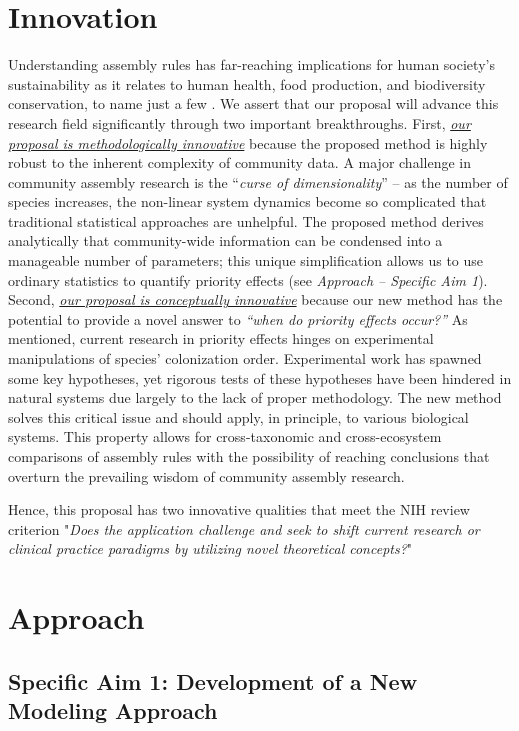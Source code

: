 \documentclass[12pt, class=article, crop=false]{standalone}
\begin{document}
\section{Innovation}
Understanding assembly rules has far-reaching implications for human society's sustainability as it relates to human health, food production, and biodiversity conservation, to name just a few \citep{fukami_historical_2015}.
We assert that our proposal will advance this research field significantly through two important breakthroughs.
First, \ul{\emph{our proposal is methodologically innovative}} because the proposed method is highly robust to the inherent complexity of community data.
A major challenge in community assembly research is the ``\textit{curse of dimensionality}'' -- as the number of species increases, the non-linear system dynamics become so complicated that traditional statistical approaches are unhelpful.
The proposed method derives analytically that community-wide information can be condensed into a manageable number of parameters; this unique simplification allows us to use ordinary statistics to quantify priority effects (see \textit{Approach -- Specific Aim 1}).
Second, \ul{\emph{our proposal is conceptually innovative}} because our new method has the potential to provide a novel answer to \textit{``when do priority effects occur?''}
As mentioned, current research in priority effects hinges on experimental manipulations of species' colonization order.
Experimental work has spawned some key hypotheses, yet rigorous tests of these hypotheses have been hindered in natural systems due largely to the lack of proper methodology. 
The new method solves this critical issue and should apply, in principle, to various biological systems.
This property allows for cross-taxonomic and cross-ecosystem comparisons of assembly rules with
the possibility of reaching conclusions that overturn the prevailing wisdom of community assembly research.

Hence, this proposal has two innovative qualities that meet the NIH review criterion "\emph{Does the application challenge and seek to shift current research or clinical practice paradigms by utilizing novel theoretical concepts?}"

\section{Approach}

\subsection*{Specific Aim 1: Development of a New Modeling Approach}
\end{document}
